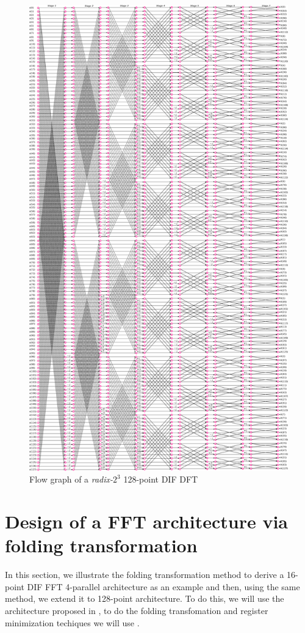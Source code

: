 \documentclass[journal,comsoc]{IEEEtran}
\begin{document}
\begin{figure} 
	\centering
	\includegraphics[width=\linewidth]{Diagramas/miSeccionFiguras/128PuntosRadix8Conexion.pdf}
	\caption{Flow graph of a \textit{radix-}$2^3$ 128-point DIF DFT}
	\label{fig:128ponits_conn}
\end{figure}



\section{Design of a FFT architecture via folding transformation} \label{sec:16points}
In this section, we illustrate the folding transformation method to derive a 16-point DIF FFT 4-parallel architecture as an example and then, using the same method, we extend it to 128-point architecture. To do this, we will use the architecture proposed in \cite{ayinala_pipelined_2012}, to do the folding transfomation and register minimization techiques we will use \cite{folding_parhi_book}.
\end{document}
